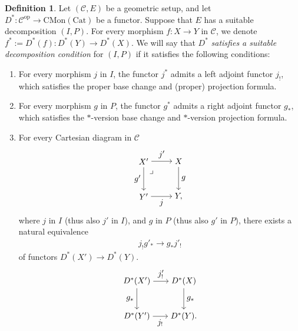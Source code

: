 \documentclass[a4paper,dvipdfmx,11pt,reqno]{amsart}
\DeclareMathOperator{\myop}{op}
\newcommand{\C}{\mathcal{C}}
\newcommand{\Cat}{\mathrm{Cat}}
\newcommand{\CMon}{\mathrm{CMon}}
\theoremstyle{definition}
\newtheorem{definition}[theorem]{Definition}
\begin{document}
\begin{definition}
  Let $(\C,E)$ be a geometric setup, and let $D^{*} : \C^{\myop} \to \CMon(\Cat)$ be a functor.
  Suppose that $E$ has a suitable decomposition $(I,P)$.
  For every morphism $f : X \to Y$ in $\C$, we denote $f^{*} := D^{*}(f) : D^{*}(Y) \to D^{*}(X)$.
  We will say that $D^{*}$ \textit{satisfies a suitable decomposition condition} for $(I,P)$ if it satisfies the following conditions:
  \begin{enumerate}
    \item For every morphism $j$ in $I$, the functor $j^{*}$ admits a left adjoint functor $j_{!}$, which satisfies the proper base change and (proper) projection formula.
    \item For every morphism $g$ in $P$, the functor $g^{*}$ admits a right adjoint functor $g_{*}$, which satisfies the $*$-version base change and $*$-version projection formula.
    \item For every Cartesian diagram in $\C$
    \[\begin{tikzpicture}[auto,->] 
      \node (tl) at (0,1.5) {$X'$}; 
      \node (tr) at (1.5,1.5) {$X$};
      \node (bl) at (0,0) {$Y'$}; 
      \node (br) at (1.5,0) {$Y,$}; 
      \draw (tl) -- node {$j'$} (tr); 
      \draw (bl) -- node[swap] {$j$} (br); 
      \draw (tl) -- node[swap] {$g'$} (bl);
      \draw (tr) -- node {$g$} (br); 
      \node at ([xshift=0.0cm, yshift=-0.2cm] tl.south east) {$\lrcorner$};
    \end{tikzpicture}\]
    where $j$ in $I$ (thus also $j'$ in $I$), and $g$ in $P$ (thus also $g'$ in $P$), there exists a natural equivalence
    \begin{align*}
      j_{!}g'_{*} \to g_{*}j'_{!}
    \end{align*}
    of functors $D^{*}(X') \to D^{*}(Y)$.
    \[\begin{tikzpicture}[auto,->] 
      \node (tl) at (0,1.5) {$D^{*}(X')$}; 
      \node (tr) at (2,1.5) {$D^{*}(X)$};
      \node (bl) at (0,0) {$D^{*}(Y')$}; 
      \node (br) at (2,0) {$D^{*}(Y).$}; 
      \draw (tl) -- node {$j'_{!}$} (tr); 
      \draw (bl) -- node[swap] {$j_{!}$} (br); 
      \draw (tl) -- node[swap] {$g_{*}$} (bl);
      \draw (tr) -- node {$g_{*}$} (br); 
    \end{tikzpicture}\]
  \end{enumerate}
\end{definition}
\end{document}
